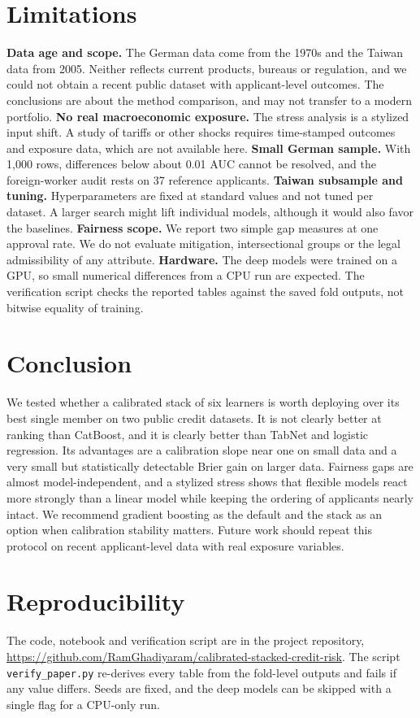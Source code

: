 \documentclass[conference,a4paper]{IEEEtran}
\newcommand{\repourl}{\url{https://github.com/RamGhadiyaram/calibrated-stacked-credit-risk}}
\begin{document}
\section{Limitations}\label{sec:limits}
\textbf{Data age and scope.} The German data come from the 1970s and the Taiwan data from 2005. Neither reflects current products, bureaus or regulation, and we could not obtain a recent public dataset with applicant-level outcomes. The conclusions are about the method comparison, and may not transfer to a modern portfolio.
\textbf{No real macroeconomic exposure.} The stress analysis is a stylized input shift. A study of tariffs or other shocks requires time-stamped outcomes and exposure data, which are not available here.
\textbf{Small German sample.} With 1{,}000 rows, differences below about 0.01 AUC cannot be resolved, and the foreign-worker audit rests on 37 reference applicants.
\textbf{Taiwan subsample and tuning.} Hyperparameters are fixed at standard values and not tuned per dataset. A larger search might lift individual models, although it would also favor the baselines.
\textbf{Fairness scope.} We report two simple gap measures at one approval rate. We do not evaluate mitigation, intersectional groups or the legal admissibility of any attribute.
\textbf{Hardware.} The deep models were trained on a GPU, so small numerical differences from a CPU run are expected. The verification script checks the reported tables against the saved fold outputs, not bitwise equality of training.

\section{Conclusion}
We tested whether a calibrated stack of six learners is worth deploying over its best single member on two public credit datasets. It is not clearly better at ranking than CatBoost, and it is clearly better than TabNet and logistic regression. Its advantages are a calibration slope near one on small data and a very small but statistically detectable Brier gain on larger data. Fairness gaps are almost model-independent, and a stylized stress shows that flexible models react more strongly than a linear model while keeping the ordering of applicants nearly intact. We recommend gradient boosting as the default and the stack as an option when calibration stability matters. Future work should repeat this protocol on recent applicant-level data with real exposure variables.

\section*{Reproducibility}
The code, notebook and verification script are in the project repository, \repourl. The script \texttt{verify\_paper.py} re-derives every table from the fold-level outputs and fails if any value differs. Seeds are fixed, and the deep models can be skipped with a single flag for a CPU-only run.
\end{document}

